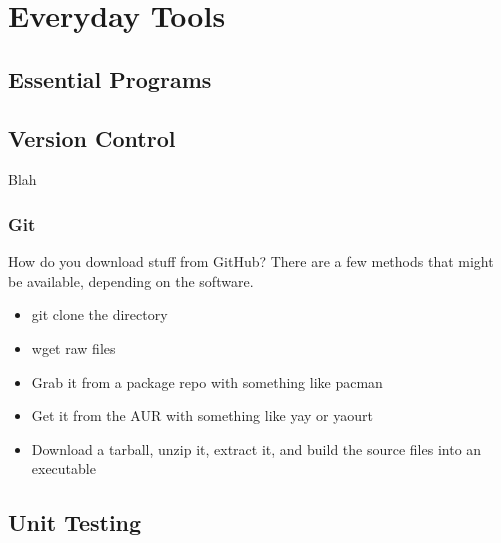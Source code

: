 \toclineskip
\section{Everyday Tools}


\subsection{Essential Programs}



\subsection{Version Control}

Blah

\subsubsection{Git}

How do you download stuff from GitHub? There are a few methods that might be available, depending on the software.
\begin{itemize}
	\item git clone the directory
	\item wget raw files
	\item Grab it from a package repo with something like pacman
	\item Get it from the AUR with something like yay or yaourt
	\item Download a tarball, unzip it, extract it, and build the source files into an executable
\end{itemize}


\subsection{Unit Testing}

